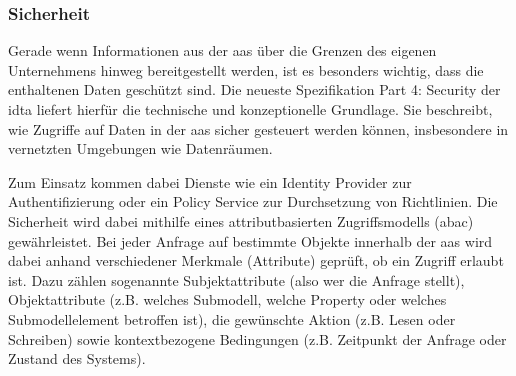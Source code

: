 
\subsubsection{Sicherheit}
\label{sec: Sicherheit}
Gerade wenn Informationen aus der \acs{aas} über die Grenzen des eigenen Unternehmens hinweg bereitgestellt werden, ist es besonders wichtig, dass die enthaltenen Daten geschützt sind. 
Die neueste Spezifikation Part 4: Security \cite{SpezifikationPart4} der \acs{idta} liefert hierfür die technische und konzeptionelle Grundlage.
Sie beschreibt, wie Zugriffe auf Daten in der \acs{aas} sicher gesteuert werden können, insbesondere in vernetzten Umgebungen wie Datenräumen.

Zum Einsatz kommen dabei Dienste wie ein Identity Provider zur Authentifizierung oder ein Policy Service zur Durchsetzung von Richtlinien.
Die Sicherheit wird dabei mithilfe eines attributbasierten Zugriffsmodells (\ac{abac}) gewährleistet.
Bei jeder Anfrage auf bestimmte Objekte innerhalb der \acs{aas} wird dabei anhand verschiedener Merkmale (Attribute) geprüft, ob ein Zugriff erlaubt ist.
Dazu zählen sogenannte Subjektattribute (also wer die Anfrage stellt), Objektattribute (z.B. welches Submodell, welche Property oder welches Submodellelement betroffen ist), die gewünschte Aktion (z.B. Lesen oder Schreiben) sowie kontextbezogene Bedingungen (z.B. Zeitpunkt der Anfrage oder Zustand des Systems).

